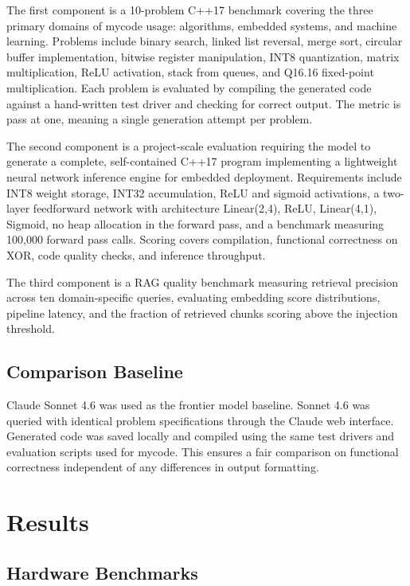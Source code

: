 \documentclass[11pt,twocolumn]{article}
\begin{document}
The first component is a 10-problem C++17 benchmark covering the three
primary domains of mycode usage: algorithms, embedded systems, and machine
learning. Problems include binary search, linked list reversal, merge sort,
circular buffer implementation, bitwise register manipulation, INT8
quantization, matrix multiplication, ReLU activation, stack from queues, and
Q16.16 fixed-point multiplication. Each problem is evaluated by compiling the
generated code against a hand-written test driver and checking for correct
output. The metric is pass at one, meaning a single generation attempt per
problem.

The second component is a project-scale evaluation requiring the model to
generate a complete, self-contained C++17 program implementing a lightweight
neural network inference engine for embedded deployment. Requirements include
INT8 weight storage, INT32 accumulation, ReLU and sigmoid activations, a
two-layer feedforward network with architecture Linear(2,4), ReLU, Linear(4,1),
Sigmoid, no heap allocation in the forward pass, and a benchmark measuring
100,000 forward pass calls. Scoring covers compilation, functional correctness
on XOR, code quality checks, and inference throughput.

The third component is a RAG quality benchmark measuring retrieval precision
across ten domain-specific queries, evaluating embedding score distributions,
pipeline latency, and the fraction of retrieved chunks scoring above the
injection threshold.

\subsection{Comparison Baseline}

Claude Sonnet 4.6 was used as the frontier model baseline. Sonnet 4.6 was
queried with identical problem specifications through the Claude web interface.
Generated code was saved locally and compiled using the same test drivers and
evaluation scripts used for mycode. This ensures a fair comparison on
functional correctness independent of any differences in output formatting.

\section{Results}

\subsection{Hardware Benchmarks}
\end{document}
